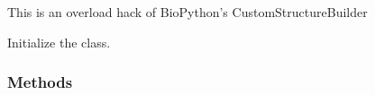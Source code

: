 \documentclass[a4paper,10pt,english]{sphinxmanual}
\begin{document}
\begin{fulllineitems}
\label{\detokenize{reference/generated/paramagpy.protein.CustomStructureBuilder:paramagpy.protein.CustomStructureBuilder}}
This is an overload hack of BioPython’s CustomStructureBuilder

\begin{fulllineitems}
\label{\detokenize{reference/generated/paramagpy.protein.CustomStructureBuilder:paramagpy.protein.CustomStructureBuilder.__init__}}
Initialize the class.
\subsubsection*{Methods}


\begin{savenotes}\sphinxatlongtablestart\begin{longtable}{}
\hline

\endfirsthead

%
{}\\
\hline

\endhead

\hline
{}\\
\endfoot

\endlastfoot


\end{longtable}
\end{savenotes}
\end{fulllineitems}
\end{fulllineitems}
\end{document}
